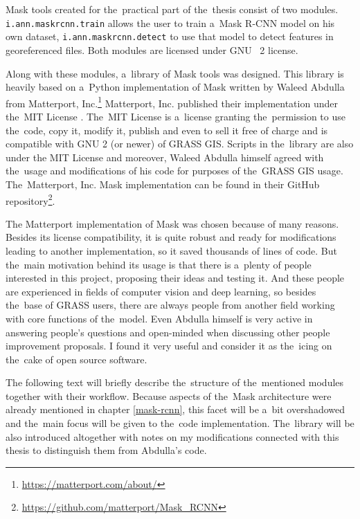 Mask  tools created for the~practical part of the~thesis consist of
two modules. \verb|i.ann.maskrcnn.train| allows the user to train a~Mask R-CNN model 
on his own dataset, \verb|i.ann.maskrcnn.detect| to use that model to 
detect features in georeferenced files. Both modules are licensed under GNU
~2 license.

Along with these modules, a~library of Mask  tools was designed. This
library is heavily based on a~Python implementation of Mask  written 
by Waleed Abdulla from Matterport, 
Inc.\footnote{\url{https://matterport.com/about/}}  Matterport, Inc. published 
their implementation under the~MIT License \cite{mit}. The~MIT License is
a~license granting the~permission to use the~code, copy it, modify it, publish and 
even to sell it free of charge and is compatible with GNU  
2 (or newer) \cite{gplv2} of GRASS GIS. Scripts in the~library are also under 
the MIT License and moreover, Waleed Abdulla himself agreed with the~usage and 
modifications of his code for purposes of the~GRASS GIS usage. The~Matterport, 
Inc. Mask  implementation can be found in their GitHub 
repository\footnote{\url{https://github.com/matterport/Mask\_RCNN}}.

The Matterport implementation of Mask  was chosen because of many 
reasons. Besides its license compatibility, it is quite robust and ready for 
modifications leading to another implementation, so it saved thousands of lines 
of code. But the~main motivation behind its usage is that there is a~plenty of 
people interested in this project, proposing their ideas and testing it. And 
these people are experienced in fields of computer vision and deep learning, so 
besides the~base of GRASS  users, there are always people from another 
field working with core functions of the~model. Even Abdulla himself is very 
active in answering people's questions and open-minded when discussing other 
people improvement proposals. I found it very useful and consider it as
the~icing on the~cake of open source software.

The following text will briefly describe the~structure of the~mentioned modules 
together with their workflow. Because aspects of the~Mask  
architecture were already mentioned in chapter \ref{mask-rcnn}, this facet will 
be a~bit overshadowed and the~main focus will be given to the~code 
implementation. The~library will be also introduced altogether with notes on my 
modifications connected with this thesis to distinguish them from Abdulla's 
code.

